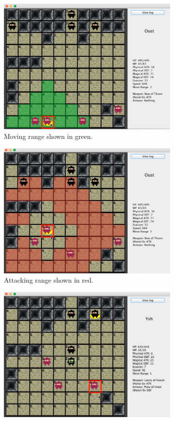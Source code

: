 \documentclass[a4paper,11pt]{article}
\begin{document}
\begin{figure}[H!]
	\begin{subfigure}{.5\textwidth}
		\centering
		\includegraphics[width=.9\linewidth]{figures/battle5}
		\caption*{Moving range shown in green.}
	\end{subfigure}\begin{subfigure}{.5\textwidth}
		\centering
		\includegraphics[width=.9\linewidth]{figures/battle1}
		\caption*{Attacking range shown in red.}
	\end{subfigure}
	\begin{subfigure}{.5\textwidth}
		\centering
		\includegraphics[width=.9\linewidth]{figures/battle2}

\end{subfigure}
\end{figure}
\end{document}
